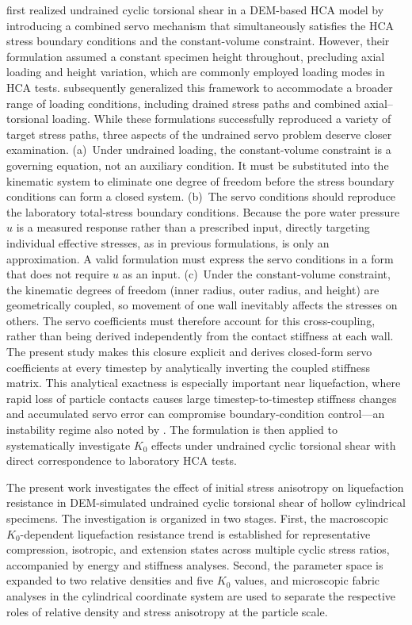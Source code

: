 \documentclass[a4paper,fleqn]{cas-sc}
\newcommand{\Kzero}{\ensuremath{K_0}}
\begin{document}
\citet{Han2024jgs} first realized undrained cyclic torsional shear in a DEM-based HCA model by introducing a combined servo mechanism that simultaneously satisfies the HCA stress boundary conditions and the constant-volume constraint. However, their formulation assumed a constant specimen height throughout, precluding axial loading and height variation, which are commonly employed loading modes in HCA tests. \citet{Ma2024} subsequently generalized this framework to accommodate a broader range of loading conditions, including drained stress paths and combined axial--torsional loading. While these formulations successfully reproduced a variety of target stress paths, three aspects of the undrained servo problem deserve closer examination.
(a)~Under undrained loading, the constant-volume constraint is a governing equation, not an auxiliary condition. It must be substituted into the kinematic system to eliminate one degree of freedom before the stress boundary conditions can form a closed system.
(b)~The servo conditions should reproduce the laboratory total-stress boundary conditions. Because the pore water pressure $u$ is a measured response rather than a prescribed input, directly targeting individual effective stresses, as in previous formulations, is only an approximation. A valid formulation must express the servo conditions in a form that does not require $u$ as an input.
(c)~Under the constant-volume constraint, the kinematic degrees of freedom (inner radius, outer radius, and height) are geometrically coupled, so movement of one wall inevitably affects the stresses on others. The servo coefficients must therefore account for this cross-coupling, rather than being derived independently from the contact stiffness at each wall.
The present study makes this closure explicit and derives closed-form servo coefficients at every timestep by analytically inverting the coupled stiffness matrix. This analytical exactness is especially important near liquefaction, where rapid loss of particle contacts causes large timestep-to-timestep stiffness changes and accumulated servo error can compromise boundary-condition control---an instability regime also noted by \citet{Ma2024}. The formulation is then applied to systematically investigate \Kzero{} effects under undrained cyclic torsional shear with direct correspondence to laboratory HCA tests.

The present work investigates the effect of initial stress anisotropy on liquefaction resistance in DEM-simulated undrained cyclic torsional shear of hollow cylindrical specimens. The investigation is organized in two stages. First, the macroscopic \Kzero{}-dependent liquefaction resistance trend is established for representative compression, isotropic, and extension states across multiple cyclic stress ratios, accompanied by energy and stiffness analyses. Second, the parameter space is expanded to two relative densities and five \Kzero{} values, and microscopic fabric analyses in the cylindrical coordinate system are used to separate the respective roles of relative density and stress anisotropy at the particle scale.
\end{document}
